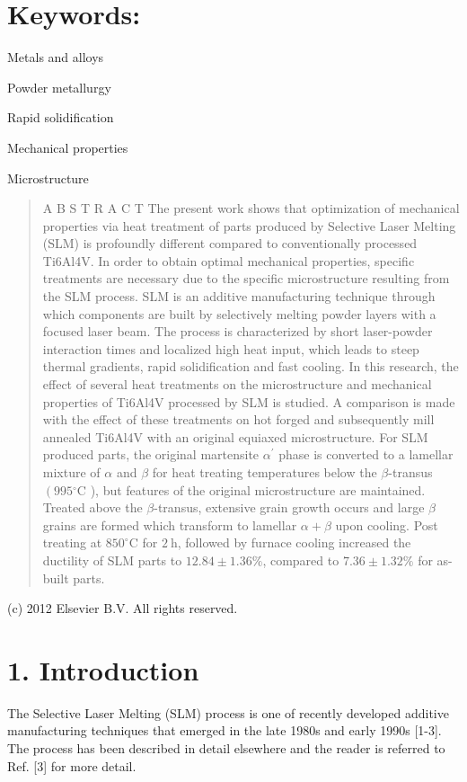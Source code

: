 \documentclass[10pt]{article}
\begin{document}
\section*{Keywords:}
Metals and alloys

Powder metallurgy

Rapid solidification

Mechanical properties

Microstructure

\begin{abstract}
A B S T R A C T The present work shows that optimization of mechanical properties via heat treatment of parts produced by Selective Laser Melting (SLM) is profoundly different compared to conventionally processed Ti6Al4V. In order to obtain optimal mechanical properties, specific treatments are necessary due to the specific microstructure resulting from the SLM process. SLM is an additive manufacturing technique through which components are built by selectively melting powder layers with a focused laser beam. The process is characterized by short laser-powder interaction times and localized high heat input, which leads to steep thermal gradients, rapid solidification and fast cooling. In this research, the effect of several heat treatments on the microstructure and mechanical properties of Ti6Al4V processed by SLM is studied. A comparison is made with the effect of these treatments on hot forged and subsequently mill annealed Ti6Al4V with an original equiaxed microstructure. For SLM produced parts, the original martensite $\alpha^{\prime}$ phase is converted to a lamellar mixture of $\alpha$ and $\beta$ for heat treating temperatures below the $\beta$-transus $\left(995{ }^{\circ} \mathrm{C}\right.$ ), but features of the original microstructure are maintained. Treated above the $\beta$-transus, extensive grain growth occurs and large $\beta$ grains are formed which transform to lamellar $\alpha+\beta$ upon cooling. Post treating at $850^{\circ} \mathrm{C}$ for $2 \mathrm{~h}$, followed by furnace cooling increased the ductility of SLM parts to $12.84 \pm 1.36 \%$, compared to $7.36 \pm 1.32 \%$ for as-built parts.
\end{abstract}

(c) 2012 Elsevier B.V. All rights reserved.

\section*{1. Introduction}
The Selective Laser Melting (SLM) process is one of recently developed additive manufacturing techniques that emerged in the late 1980s and early 1990s [1-3]. The process has been described in detail elsewhere and the reader is referred to Ref. [3] for more detail.
\end{document}
